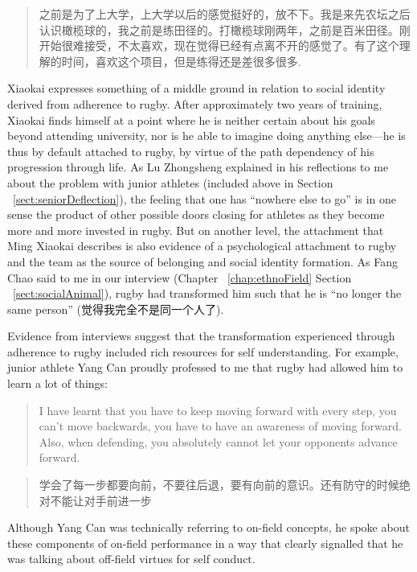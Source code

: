 \begin{CJK}{UTF8}{gbsn}
\begin{quote}
    之前是为了上大学，上大学以后的感觉挺好的，放不下。我是来先农坛之后认识橄榄球的，我之前是练田径的。打橄榄球刚两年，之前是百米田径。刚开始很难接受，不太喜欢，现在觉得已经有点离不开的感觉了。有了这个理解的时间，喜欢这个项目，但是练得还是差很多很多.
\end{quote}

Xiaokai expresses something of a middle ground in relation to social identity derived from adherence to rugby.  After approximately two years of training, Xiaokai finds himself at a point where he is neither certain about his goals beyond attending university, nor is he able to imagine doing anything else---he is thus by default attached to rugby, by virtue of the path dependency of his progression through life.  As Lu Zhongsheng explained in his reflections to me about the problem with junior athletes (included above in Section ~\ref{sect:seniorDeflection}), the feeling that one has ``nowhere else to go'' is in one sense the product of other possible doors closing for athletes as they become more and more invested in rugby.  But on another level, the attachment that Ming Xiaokai describes is also evidence of a psychological attachment to rugby and the team as the source of belonging and social identity formation.   As Fang Chao said to me in our interview (Chapter ~\ref{chap:ethnoField} Section ~\ref{sect:socialAnimal}), rugby had transformed him such that he is ``no longer the same person'' (觉得我完全不是同一个人了).

Evidence from interviews suggest that the transformation experienced through adherence to rugby included rich resources for self understanding.  For example, junior athlete Yang Can proudly professed to me that rugby had allowed him to learn a lot of things:

\begin{quote}
    I have learnt that you have to keep moving forward with every step, you can’t move backwards, you have to have an awareness of moving forward.  Also, when defending, you absolutely cannot let your opponents advance forward.
\end{quote}

\begin{quote}
    学会了每一步都要向前，不要往后退，要有向前的意识。还有防守的时候绝对不能让对手前进一步
\end{quote}

Although Yang Can was technically referring to on-field concepts, he spoke about these components of on-field performance in a way that clearly signalled that he was talking about off-field virtues for self conduct.


\end{CJK}

